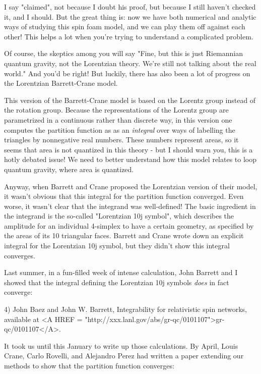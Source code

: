 I say "claimed", not because I doubt his proof, but because I still
haven't checked it, and I should.  But the great thing is: now we have
both numerical and analytic ways of studying this spin foam model, and
we can play them off against each other!  This helps a lot when you're
trying to understand a complicated problem.

Of course, the skeptics among you will say "Fine, but this is just
Riemannian quantum gravity, not the Lorentzian theory.  We're still not
talking about the real world."  And you'd be right!  But luckily, there
has also been a lot of progress on the Lorentzian Barrett-Crane model.

This version of the Barrett-Crane model is based on the Lorentz group
instead of the rotation group.  Because the representations of the
Lorentz group are parametrized in a continuous rather than discrete way,
in this version one computes the partition function as as an \emph{integral}
over ways of labelling the triangles by nonnegative real numbers.  These
numbers represent areas, so it seems that area is not quantized in this
theory - but I should warn you, this is a hotly debated issue!  We need
to better understand how this model relates to loop quantum gravity,
where area is quantized.

Anyway, when Barrett and Crane proposed the Lorentzian version of their
model, it wasn't obvious that this integral for the partition function
converged.  Even worse, it wasn't clear that the integrand was
well-defined!  The basic ingredient in the integrand is the so-called
"Lorentzian 10j symbol", which describes the amplitude for an
individual 4-simplex to have a certain geometry, as specified by the
areas of its 10 triangular faces.  Barrett and Crane wrote down an
explicit integral for the Lorentzian 10j symbol, but they didn't show
this integral converges.

Last summer, in a fun-filled week of intense calculation, John Barrett
and I showed that the integral defining the Lorentzian 10j symbols
\emph{does} in fact converge:

4) John Baez and John W. Barrett, Integrability for relativistic 
spin networks, available at <A HREF = "http://xxx.lanl.gov/abs/gr-qc/0101107">gr-qc/0101107</A>.

It took us until this January to write up those calculations.  By April,
Louis Crane, Carlo Rovelli, and Alejandro Perez had written a paper
extending our methods to show that the partition function converges:


